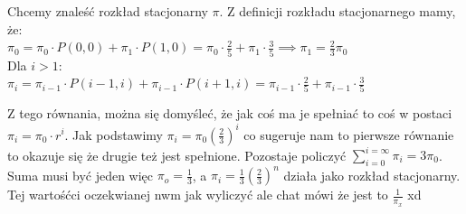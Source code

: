 Chcemy znaleść rozkład stacjonarny \(\pi\). Z definicji rozkładu stacjonarnego mamy, że:\\
\(\pi_0 = \pi_0 \cdot P(0,0) + \pi_1 \cdot P(1,0) = \pi_0 \cdot \frac{2}{5} + \pi_1 \cdot \frac{3}{5}  \implies \pi_1 = \frac{2}{3} \pi_0\)\\

Dla \(i>1\): \\
\(\pi_i = \pi_{i-1} \cdot P(i-1,i) + \pi_{i-1} \cdot P(i+1, i) = \pi_{i-1} \cdot \frac{2}{5}+ \pi_{i-1} \cdot \frac{3}{5}\)

Z tego równania, można się domyśleć, że jak coś ma je spełniać to coś w postaci \(\pi_i =\pi_0 \cdot r^i\). Jak podstawimy \(\pi_i = \pi_0 (\frac{2}{3} ) ^i\) co sugeruje nam to pierwsze równanie to okazuje się że drugie też jest spełnione. Pozostaje policzyć \(\sum_{i = 0}^{i=\infty} \pi_i = 3\pi_0\). Suma musi być jeden więc \(\pi_o = \frac{1}{3}\), a \(\pi_i = \frac{1}{3}(\frac{2}{3})^n\) działa jako rozkład stacjonarny.\\

Tej wartośćci oczekwianej nwm jak wyliczyć ale chat mówi że jest to \(\frac{1}{\pi_x}\) xd

